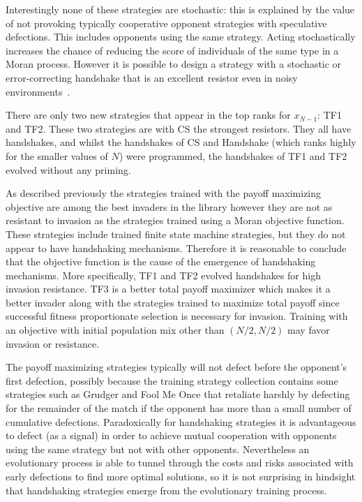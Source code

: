 \documentclass[10pt,letterpaper]{article}
\begin{document}
Interestingly none of these strategies are stochastic: this is explained by the
value of not provoking typically cooperative opponent strategies with
speculative defections. This includes opponents using the same strategy. Acting
stochastically increases the chance of reducing the score of individuals of the
same type in a Moran process. However it is possible to design a strategy with
a stochastic or error-correcting handshake that is an excellent resistor even in
noisy environments~\cite{Lee2015}.

There are only two new strategies that appear in the top ranks for
\(x_{N-1}\): TF1 and TF2. These two strategies are with CS the strongest
resistors. They all have handshakes, and whilst the handshakes of CS and
Handshake (which ranks highly for the smaller values of \(N\)) were
programmed, the handshakes of TF1 and TF2 evolved without any priming.

As described previously the strategies trained with
the payoff maximizing objective are among the best invaders in the library
however they are not as resistant to invasion as the strategies trained using a
Moran objective function. These strategies include trained finite state machine
strategies, but they do not appear to have handshaking mechanisms. Therefore it
is reasonable to conclude that the objective function is the cause of the
emergence of handshaking mechanisms. More specifically, TF1 and TF2 evolved
handshakes for high invasion resistance. TF3 is a better total payoff maximizer
which makes it a better invader along with the strategies
trained to maximize total payoff since successful fitness proportionate selection
is necessary for invasion. Training with an objective with initial population
mix other than $(N/2, N/2)$ may favor invasion or resistance.

The payoff maximizing strategies typically will not defect before the opponent's
first defection, possibly because the training strategy collection contains some
strategies such as Grudger and Fool Me Once that retaliate harshly by defecting
for the remainder of the match if the opponent has more than a small number of
cumulative defections. Paradoxically for handshaking strategies
it is advantageous to defect (as a signal)
in order to achieve mutual cooperation with opponents using the same strategy
but not with other opponents. Nevertheless an evolutionary process is able to
tunnel through the costs and risks associated with early defections to find more
optimal solutions, so it is not surprising in hindsight that handshaking
strategies emerge from the evolutionary training process.
\end{document}

